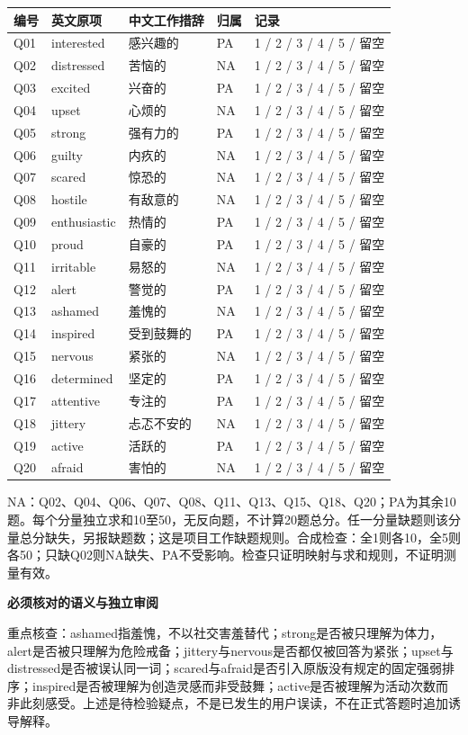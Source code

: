 \documentclass[11pt,a4paper]{article}
\newcommand{\reviewsubsection}[1]{\par\Needspace{4\baselineskip}\begin{center}{\titlelatin\titlecjk\bfseries\fontsize{12}{18}\selectfont #1}\end{center}}
\begin{document}
\begin{longtable}{L{12mm}L{33mm}L{36mm}L{16mm}L{40mm}}
编号 & 英文原项 & 中文工作措辞 & 归属 & 记录\\\hline
Q01 & interested & 感兴趣的 & PA & 1 / 2 / 3 / 4 / 5 / 留空\\
Q02 & distressed & 苦恼的 & NA & 1 / 2 / 3 / 4 / 5 / 留空\\
Q03 & excited & 兴奋的 & PA & 1 / 2 / 3 / 4 / 5 / 留空\\
Q04 & upset & 心烦的 & NA & 1 / 2 / 3 / 4 / 5 / 留空\\
Q05 & strong & 强有力的 & PA & 1 / 2 / 3 / 4 / 5 / 留空\\
Q06 & guilty & 内疚的 & NA & 1 / 2 / 3 / 4 / 5 / 留空\\
Q07 & scared & 惊恐的 & NA & 1 / 2 / 3 / 4 / 5 / 留空\\
Q08 & hostile & 有敌意的 & NA & 1 / 2 / 3 / 4 / 5 / 留空\\
Q09 & enthusiastic & 热情的 & PA & 1 / 2 / 3 / 4 / 5 / 留空\\
Q10 & proud & 自豪的 & PA & 1 / 2 / 3 / 4 / 5 / 留空\\
Q11 & irritable & 易怒的 & NA & 1 / 2 / 3 / 4 / 5 / 留空\\
Q12 & alert & 警觉的 & PA & 1 / 2 / 3 / 4 / 5 / 留空\\
Q13 & ashamed & 羞愧的 & NA & 1 / 2 / 3 / 4 / 5 / 留空\\
Q14 & inspired & 受到鼓舞的 & PA & 1 / 2 / 3 / 4 / 5 / 留空\\
Q15 & nervous & 紧张的 & NA & 1 / 2 / 3 / 4 / 5 / 留空\\
Q16 & determined & 坚定的 & PA & 1 / 2 / 3 / 4 / 5 / 留空\\
Q17 & attentive & 专注的 & PA & 1 / 2 / 3 / 4 / 5 / 留空\\
Q18 & jittery & 忐忑不安的 & NA & 1 / 2 / 3 / 4 / 5 / 留空\\
Q19 & active & 活跃的 & PA & 1 / 2 / 3 / 4 / 5 / 留空\\
Q20 & afraid & 害怕的 & NA & 1 / 2 / 3 / 4 / 5 / 留空\\
\end{longtable}
NA：Q02、Q04、Q06、Q07、Q08、Q11、Q13、Q15、Q18、Q20；PA为其余10题。每个分量独立求和10至50，无反向题，不计算20题总分。任一分量缺题则该分量总分缺失，另报缺题数；这是项目工作缺题规则。合成检查：全1则各10，全5则各50；只缺Q02则NA缺失、PA不受影响。检查只证明映射与求和规则，不证明测量有效。

\reviewsubsection{10.2 必须核对的语义与独立审阅}
重点核查：ashamed指羞愧，不以社交害羞替代；strong是否被只理解为体力，alert是否被只理解为危险戒备；jittery与nervous是否都仅被回答为紧张；upset与distressed是否被误认同一词；scared与afraid是否引入原版没有规定的固定强弱排序；inspired是否被理解为创造灵感而非受鼓舞；active是否被理解为活动次数而非此刻感受。上述是待检验疑点，不是已发生的用户误读，不在正式答题时追加诱导解释。
\end{document}
